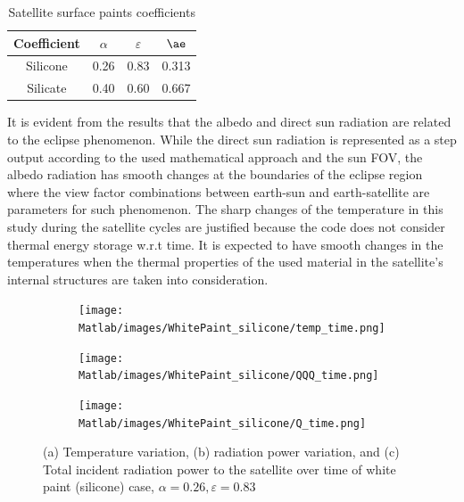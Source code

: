 \documentclass[11pt]{article}
\begin{document}
\begin{table}[H]
    \centering
    \caption{Satellite surface paints coefficients}
    \begin{tabular}{c |c c c}
    \hline
        Coefficient & $\alpha$ & $\varepsilon$ & $\ae$ \\ \hline
        Silicone &  0.26 & 0.83 & 0.313 \\
         Silicate & 0.40&0.60 & 0.667  \\ \hline
    \end{tabular}
    \label{tb:01}
\end{table}

It is evident from the results that the albedo and direct sun radiation are related to the eclipse phenomenon. While the direct sun radiation is represented as a step output according to the used mathematical approach and the sun \ac{FOV}, the albedo radiation has smooth changes at the boundaries of the eclipse region where the view factor combinations between earth-sun and earth-satellite are parameters for such phenomenon. The sharp changes of the temperature in this study during the satellite cycles are justified because the code does not consider thermal energy storage w.r.t time. It is expected to have smooth changes in the temperatures when the thermal properties of the used material in the satellite's internal structures are taken into consideration.



 

\begin{figure}[H]
    \centering
    \begin{subfigure}[b]{1\textwidth}
        \texttt{[image: Matlab/images/WhitePaint\_silicone/temp\_time.png]}
        \caption{}
        \label{fig:temptime1}
    \end{subfigure}
    \begin{subfigure}[b]{1\textwidth}
        \texttt{[image: Matlab/images/WhitePaint\_silicone/QQQ\_time.png]}
        \caption{}
        \label{fig:QQQtimme1}
    \end{subfigure}
    \begin{subfigure}[b]{1\textwidth}
        \texttt{[image: Matlab/images/WhitePaint\_silicone/Q\_time.png]}
        \caption{}
        \label{fig:Qtimme1}
    \end{subfigure}
    \caption{(a) Temperature variation, (b) radiation power variation, and (c) Total incident radiation power to the satellite over time of white paint (silicone) case, $\alpha=0.26, \varepsilon = 0.83$}
\end{figure}
\end{document}
